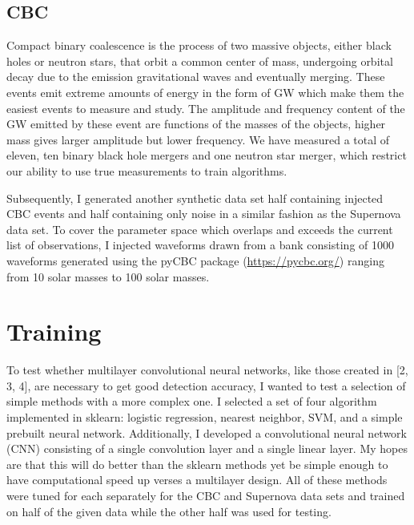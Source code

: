 \documentclass{article}
\begin{document}
\subsection{CBC}

Compact binary coalescence is the process of two massive objects, either black holes or neutron stars, that orbit a common center of mass, undergoing orbital decay due to the emission gravitational waves and eventually merging. These events emit extreme amounts of energy in the form of GW which make them the easiest events to measure and study. The amplitude and frequency content of the GW emitted by these event are functions of the masses of the objects, higher mass gives larger amplitude but lower frequency. We have measured a total of eleven, ten binary black hole mergers and one neutron star merger, which restrict our ability to use true measurements to train algorithms. 

Subsequently, I generated another synthetic data set half containing injected CBC events and half containing only noise in a similar fashion as the Supernova data set. To cover the parameter space which overlaps and exceeds the current list of observations, I injected waveforms drawn from a bank consisting of 1000 waveforms generated using the pyCBC package (\href{https://pycbc.org/}{https://pycbc.org/}) ranging from 10 solar masses to 100 solar masses. 

\section{Training}

To test whether multilayer convolutional neural networks, like those created in [2, 3, 4], are necessary to get good detection accuracy, I wanted to test a selection of simple methods with a more complex one. I selected a set of four algorithm implemented in sklearn: logistic regression, nearest neighbor, SVM, and a simple prebuilt neural network. Additionally, I developed a convolutional neural network (CNN) consisting of a single convolution layer and a single linear layer. My hopes are that this will do better than the sklearn methods yet be simple enough to have computational speed up verses a multilayer design. All of these methods were tuned for each separately for the CBC and Supernova data sets and trained on half of the given data while the other half was used for testing.
\end{document}
